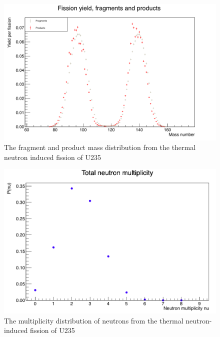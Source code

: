 \documentclass[]{article}
\begin{document}
\begin{figure} [H]
	\centering
	\includegraphics[scale=0.36]{U235_fragment_product_distribution.png}
	\caption{The fragment and product mass distribution from the thermal neutron induced fission of U235}
	\label{fig:U235_fragment_product_distribution}
\end{figure}

\begin{figure} [H]
	\centering
	\includegraphics[scale=0.36]{U235_n_mult.png}
	\caption{The multiplicity distribution of neutrons from the thermal neutron-induced fission of U235}
	\label{fig:U235_n_mult}
\end{figure}
\end{document}
